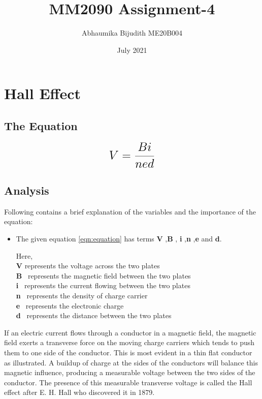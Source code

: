 \documentclass[a4paper, 12pt]{article}
\begin{document}
\title{MM2090 Assignment-4}
\author{Abhaumika Bijudith ME20B004}
\date{July 2021}
\maketitle
\section{Hall Effect}
\subsection{The Equation}

\begin{equation}
 {\LARGE{\textbf{$V =\frac{Bi}{{ned}}$}}}
 \label{eqn:equation}
\end{equation}


\subsection{Analysis}
Following contains a brief explanation of the variables and the importance of the equation:
\begin{itemize}
\item {\normalsize {The given equation \ref{eqn:equation} has terms \textbf{V} ,\textbf{B} , \textbf{i} ,\textbf{n} ,\textbf{e} and  \textbf{d}.}}

{ Here,}\\
{\textbf{V} represents the voltage across the two plates }\\
{\textbf{B} \  represents the magnetic field between the two plates}\\
{\textbf{i} \  represents the current flowing between the two plates}\\
{\textbf{n} \  represents the density of charge carrier}\\
{\textbf{e} \ represents the electronic charge}\\
{\textbf{d} \ represents the distance between the two plates}
\end{itemize}

If an electric current flows through a conductor in a magnetic field, the magnetic field exerts a transverse force on the moving charge carriers which tends to push them to one side of the conductor. This is most evident in a thin flat conductor as illustrated. A buildup of charge at the sides of the conductors will balance this magnetic influence, producing a measurable voltage between the two sides of the conductor. The presence of this measurable transverse voltage is called the Hall effect after E. H. Hall who discovered it in 1879. \cite{weblink1}
\end{document}
